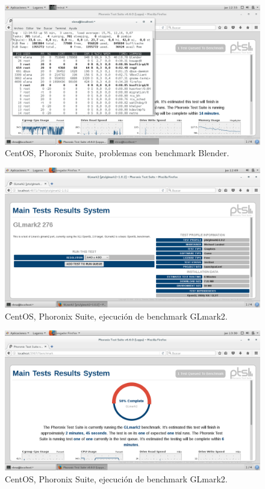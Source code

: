 \begin{figure}[H] 
	\centering
	\includegraphics[width=14.7cm]{./img/ejercicio1_10.png} 	
	\caption{CentOS, Phoronix Suite, problemas con benchmark Blender.} \label{fig:ejercicio1_10}
\end{figure}

\begin{figure}[H] 
	\centering
	\includegraphics[width=14.7cm]{./img/ejercicio1_11.png} 	
	\caption{CentOS, Phoronix Suite, ejecución de benchmark GLmark2.} \label{fig:ejercicio1_11}
\end{figure}

\begin{figure}[H] 
	\centering
	\includegraphics[width=14.7cm]{./img/ejercicio1_12.png} 	
	\caption{CentOS, Phoronix Suite, ejecución de benchmark GLmark2.} \label{fig:ejercicio1_12}
\end{figure}

